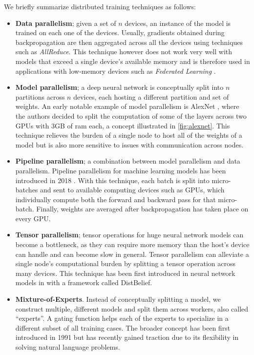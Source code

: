 We briefly summarize distributed training techniques as follows:
\begin{itemize}
    \item \textbf{Data parallelism};
          given a set of $n$ devices, an instance of the model is trained on each one of the devices.
          Usually, gradients obtained during backpropagation are then aggregated across all the devices using techniques such as \textit{AllReduce}.
          This technique however does not work very well with models that exceed a single device's available memory and is therefore used in applications with low-memory devices such as \textit{Federated Learning} \cite{li2019federatedlearning}.

    \item \textbf{Model parallelism};
          a deep neural network is conceptually split into $n$ partitions across $n$ devices, each hosting a different partition and set of weights.
          An early notable example of model parallelism is AlexNet \cite{alexnet2012}, where the authors decided to split the computation of some of the layers across two GPUs with 3GB of ram each, a concept illustrated in \autoref{fig:alexnet}.
          This technique relieves the burden of a single node to host all of the weights of a model but is also more sensitive to issues with communication across nodes.

    \item \textbf{Pipeline parallelism};
          a combination between model parallelism and data parallelism.
          Pipeline parallelism for machine learning models has been introduced in 2018 \cite{huang2018gpipe}.
          With this technique, each batch is split into micro-batches and sent to available computing devices such as GPUs, which individually compute both the forward and backward pass for that micro-batch.
          Finally, weights are averaged after backpropagation has taken place on every GPU.

    \item \textbf{Tensor parallelism};
          tensor operations for huge neural network models can become a bottleneck, as they can require more memory than the host's device can handle and can become slow in general.
          Tensor parallelism can alleviate a single node's computational burden by splitting a tensor operation across many devices.
          This technique has been first introduced in neural network models in \cite{dean2012distbelief} with a framework called DistBelief.

    \item \textbf{Mixture-of-Experts}.
          Instead of conceptually splitting a model, we construct multiple, different models and split them across workers, also called ``experts''.
          A gating function helps each of the experts to specialize in a different subset of all training cases.
          The broader concept has been first introduced in 1991 \cite{Jacobs1991mixtureofexperts} but has recently gained traction due to its flexibility in solving natural language problems.
\end{itemize}

